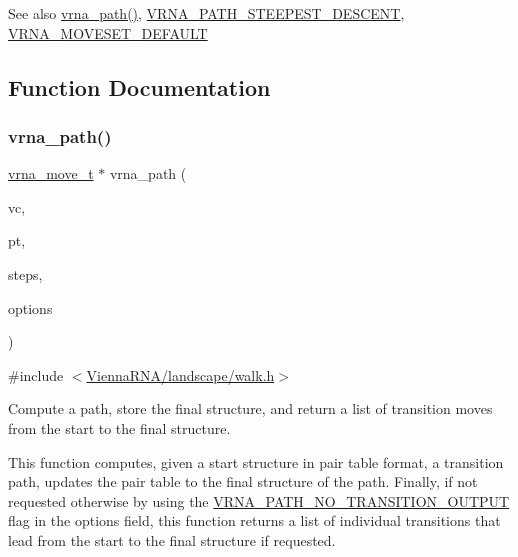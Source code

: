 \begin{DoxySeeAlso}{See also}
\mbox{\hyperlink{group__paths__walk_gaef7afadc36933b80706de49fe36e7b94}{vrna\+\_\+path()}}, \mbox{\hyperlink{group__paths__walk_ga705cea2b3243a38a2d6e3b1e141ed061}{V\+R\+N\+A\+\_\+\+P\+A\+T\+H\+\_\+\+S\+T\+E\+E\+P\+E\+S\+T\+\_\+\+D\+E\+S\+C\+E\+NT}}, \mbox{\hyperlink{group__neighbors_gaa5ffec4dd0d02df320f123e6888154d1}{V\+R\+N\+A\+\_\+\+M\+O\+V\+E\+S\+E\+T\+\_\+\+D\+E\+F\+A\+U\+LT}} 
\end{DoxySeeAlso}


\subsection{Function Documentation}
\mbox{\label{group__paths__walk_gaef7afadc36933b80706de49fe36e7b94}} 
\subsubsection{\texorpdfstring{vrna\_path()}{vrna\_path()}}
{\footnotesize\ttfamily \mbox{\hyperlink{group__neighbors_ga08630e00206cd163ea29c462bf5f4755}{vrna\+\_\+move\+\_\+t}} $\ast$ vrna\+\_\+path (\begin{DoxyParamCaption}\item[{\mbox{\hyperlink{group__fold__compound_ga1b0cef17fd40466cef5968eaeeff6166}{vrna\+\_\+fold\+\_\+compound\+\_\+t}} $\ast$}]{vc,  }\item[{short $\ast$}]{pt,  }\item[{unsigned int}]{steps,  }\item[{unsigned int}]{options }\end{DoxyParamCaption})}



{\ttfamily \#include $<$\mbox{\hyperlink{landscape_2walk_8h}{Vienna\+R\+N\+A/landscape/walk.\+h}}$>$}



Compute a path, store the final structure, and return a list of transition moves from the start to the final structure. 

This function computes, given a start structure in pair table format, a transition path, updates the pair table to the final structure of the path. Finally, if not requested otherwise by using the \mbox{\hyperlink{group__paths__walk_ga1ee63e54ecf136491e12ff03ede2622d}{V\+R\+N\+A\+\_\+\+P\+A\+T\+H\+\_\+\+N\+O\+\_\+\+T\+R\+A\+N\+S\+I\+T\+I\+O\+N\+\_\+\+O\+U\+T\+P\+UT}} flag in the {\ttfamily options} field, this function returns a list of individual transitions that lead from the start to the final structure if requested.


